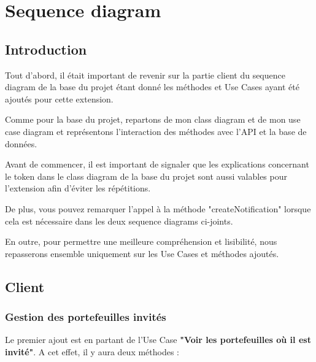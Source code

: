 \section{Sequence diagram}
\subsection{Introduction}

\begin{flushleft}
Tout d'abord, il était important de revenir sur la partie client du sequence diagram de la base du projet étant donné les méthodes et Use Cases ayant été ajoutés pour cette extension.
\end{flushleft}

\begin{flushleft}
Comme pour la base du projet, repartons de mon class diagram et de mon use case diagram et représentons l'interaction des méthodes avec l'API et la base de données.
\end{flushleft}

\begin{flushleft}
Avant de commencer, il est important de signaler que les explications concernant le token dans le class diagram de la base du projet sont aussi valables pour l'extension afin d'éviter les répétitions.
\end{flushleft}

\begin{flushleft}
De plus, vous pouvez remarquer l'appel à la méthode "createNotification" lorsque cela est nécessaire dans les deux sequence diagrams ci-joints.
\end{flushleft}

\begin{flushleft}
En outre, pour permettre une meilleure compréhension et lisibilité, nous repasserons ensemble uniquement sur les Use Cases et méthodes ajoutés.
\end{flushleft}

\newpage
\subsection{Client}
\subsubsection{Gestion des portefeuilles invités}

\begin{flushleft}
Le premier ajout est en partant de l'Use Case \textbf{"Voir les portefeuilles où il est invité"}.
A cet effet, il y aura deux méthodes :
\end{flushleft}

